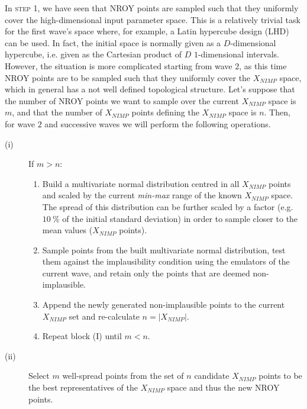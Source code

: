 \vspace{0.2cm}
In \textsc{step 1}, we have seen that NROY points are sampled such that they uniformly cover the high-dimensional input parameter space. This is a relatively trivial task for the first wave's space where, for example, a Latin hypercube design (\acs{LHD})~\cite{Iman:1981} can be used. In fact, the initial space is normally given as a $D$-dimensional hypercube, i.e. given as the Cartesian product of $D$ $1$-dimensional intervals. However, the situation is more complicated starting from wave $2$, as this time NROY points are to be sampled such that they uniformly cover the $X_{NIMP}$ space, which in general has a not well defined topological structure. Let's suppose that the number of NROY points we want to sample over the current $X_{NIMP}$ space is $m$, and that the number of $X_{NIMP}$ points defining the $X_{NIMP}$ space is $n$. Then, for wave $2$ and successive waves we will perform the following operations.

\begin{description}
    \item[(i)] If $m > n$:
        \begin{enumerate}
            \item Build a multivariate normal distribution centred in all $X_{NIMP}$ points and scaled by the current \textit{min-max} range of the known $X_{NIMP}$ space. The spread of this distribution can be further scaled by a factor (e.g. $\SI{10}{\percent}$ of the initial standard deviation) in order to sample closer to the mean values ($X_{NIMP}$ points).
            \item Sample points from the built multivariate normal distribution, test them against the implausibility condition using the emulators of the current wave, and retain only the points that are deemed non-implausible.
            \item Append the newly generated non-implausible points to the current $X_{NIMP}$ set and re-calculate $n=\vert X_{NIMP}\vert$.
            \item Repeat block \textsc{(I)} until $m < n$.
        \end{enumerate}
 
    \item[(ii)]
        Select $m$ well-spread points from the set of $n$ candidate $X_{NIMP}$ points to be the best representatives of the $X_{NIMP}$ space and thus the new NROY points.
\end{description}


